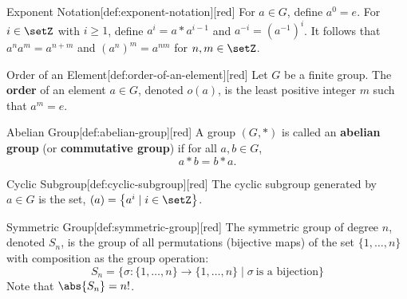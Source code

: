 \begin{define}{Exponent Notation}[def:exponent-notation][red]
  For $a \in G$, define $a^0=e$. 
  For $i \in \setZ$ with $i \geq 1$, 
  define $a^i=a * a^{i-1}$ and $a^{-i}=\left(a^{-1}\right)^i$. 
  It follows that $a^n a^m=a^{n+m}$ and $\left(a^n\right)^m=a^{n m}$ for $n, m \in \setZ$.
\end{define}
\begin{define}{Order of an Element}[def:order-of-an-element][red]
  Let $G$ be a finite group. The \textbf{order} of an 
  element $a \in G$, denoted $o(a)$, is the least positive 
  integer $m$ such that $a^m=e$.
\end{define}
\begin{define}{Abelian Group}[def:abelian-group][red]
  A group $(G, *)$ is called an \textbf{abelian group} (or \textbf{commutative group}) if for all $a, b \in G$, 
  \[
    a * b = b * a.
  \]
\end{define}
\begin{define}{Cyclic Subgroup}[def:cyclic-subgroup][red]
  The cyclic subgroup generated by $a \in G$ is the 
  set, $\left(a\right)=\left\{a^i \mid i \in \setZ\right\}$.
\end{define}
\begin{define}{Symmetric Group}[def:symmetric-group][red]
  The symmetric group of degree $n$, denoted $S_n$, is the group of all permutations (bijective maps) of the set $\{1,\dots,n\}$ with composition as the group operation:
  \[
    S_n=\{\sigma:\{1,\dots,n\}\to\{1,\dots,n\}\mid \sigma\ \text{is a bijection}\}
  \]
  Note that $\abs{S_n}=n!$.
\end{define}


